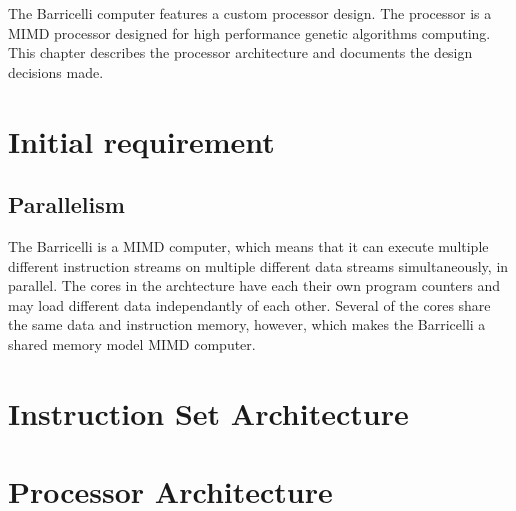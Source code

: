 The Barricelli computer features a custom processor design.
The processor is a MIMD processor designed for high performance genetic algorithms computing.
This chapter describes the processor architecture and documents the design decisions made.

\section {Initial requirement}
     \label{fpga:section:initial_requirements}
\subsection{Parallelism}

The Barricelli is a MIMD computer, which means that it can execute multiple different instruction streams on multiple different data streams simultaneously, in parallel.
The cores in the archtecture have each their own program counters and may load different data independantly of each other.
Several of the cores share the same data and instruction memory, however, which makes the Barricelli a shared memory model MIMD computer.



\section{Instruction Set Architecture} \label{fpga:isa:s:isa}
    

\section {Processor Architecture}
     \label{fpga:section:cpu_architecture}
